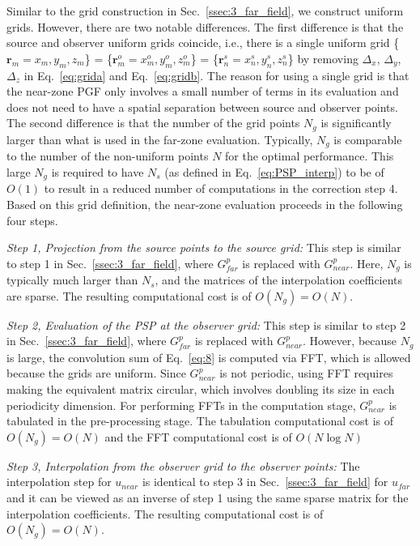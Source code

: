 \documentclass{article}
\begin{document}
Similar to the grid construction in Sec.~\ref{ssec:3_far_field}, we construct uniform grids. However, there are two notable differences. The first difference is that the source and observer uniform grids coincide, i.e., there is a single uniform grid \{$\mathbf{r}_m={x_m, y_m, z_m}$\} =
\{$\mathbf{r}_m^o={x_m^o, y_m^o, z_m^o}$\} = \{$\mathbf{r}_n^s={x_n^s, y_n^s, z_n^s}$\} by  removing $\Delta_x$, $\Delta_y$, $\Delta_z$ in Eq.~\eqref{eq:grida} and Eq.~\eqref{eq:gridb}. The reason for using a single grid is that the near-zone PGF only involves a small number of terms in its evaluation and does not need to have a spatial separation between source and observer points. The second difference is that the number of the grid points $N_g$ is significantly larger than what is used in the far-zone evaluation. Typically, $N_g$ is comparable to the number of the non-uniform points $N$ for the optimal performance. This large $N_g$ is required to have $N_s$ (as defined in Eq.~\eqref{eq:PSP_interp}) to be of $O(1)$ to result in a reduced number of computations in the correction step 4. Based on this grid definition, the near-zone evaluation proceeds in the following four steps.

\textit{Step 1, Projection from the source points to the source grid:}
This step is similar to step 1 in Sec.~\ref{ssec:3_far_field}, where $G^p_{far}$ is replaced with $G^p_{near}$. Here, $N_g$ is typically much larger than $N_s$, and the matrices of the interpolation coefficients are sparse. The resulting computational cost is of $O(N_g)=O(N)$.

\textit{Step 2, Evaluation of the PSP at the observer grid:}
This step is similar to step 2 in Sec.~\ref{ssec:3_far_field}, where $G^p_{far}$ is replaced with $G^p_{near}$. However, because $N_g$ is large, the convolution sum of Eq.~\eqref{eq:8} is computed via FFT, which is allowed because the grids are uniform. Since $G^p_{near}$ is not periodic, using FFT requires making the equivalent matrix circular, which involves doubling its size in each periodicity dimension. For performing FFTs in the computation stage, $G_{near}^p$ is tabulated in the pre-processing stage. The tabulation computational cost is of $O(N_g)=O(N)$ and the FFT computational cost is of $O(N \log N)$

\textit{Step 3, Interpolation from the observer grid to the observer points:}
The interpolation step for $u_{near}$ is identical to step 3 in Sec.~\ref{ssec:3_far_field} for $u_{far}$ and it can be viewed as an inverse of step 1 using the same sparse matrix for the interpolation coefficients. The resulting computational cost is of $O(N_g)=O(N)$.
\end{document}

